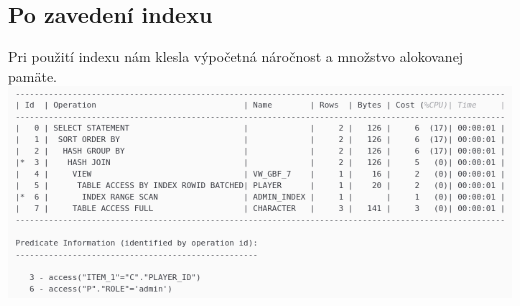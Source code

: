 \documentclass[a4paper,12pt,oneside]{article}
\begin{document}
\subsection{Po zavedení indexu}
Pri použití indexu nám klesla výpočetná náročnost a množstvo alokovanej pamäte.\\
\includegraphics[origin=c,scale=0.5]{explain_second}
\end{document}
